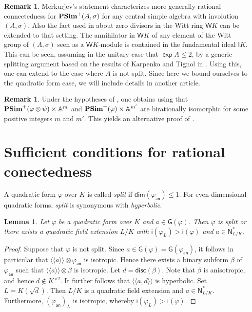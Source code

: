 \documentclass[twoside,11pt]{amsart}
\numberwithin{equation}{section}
\newtheorem{lem}[equation]{Lemma}
\theoremstyle{definition}
\newtheorem{rem}[equation]{Remark}
\renewcommand{\dim}{\operatorname{\mathsf{dim}}}
\renewcommand\exp{\operatorname{\mathsf{exp}}}
\newcommand\N{\operatorname{N}}
\newcommand{\vf}{\varphi}
\newcommand{\sq}[1]{{#1}^{\times 2}}
\newcommand{\s}{\sigma}
\newcommand{\la}{\langle}
\newcommand{\ra}{\rangle}
\newcommand{\lla}{\la\!\la}
\newcommand{\rra}{\ra\!\ra}
\newcommand{\an}{\mathsf{an}}
\renewcommand{\leq}{\leqslant}
\newcommand{\I}{\mathsf{I}}
\renewcommand{\N}{\mathsf{N}}
\newcommand{\disc}{\mathsf{disc}}
\newcommand{\G}{\mathsf{G}}
\renewcommand{\dim}{\mathsf{dim}}
\renewcommand{\leq}{\leqslant}
\newcommand{\wi}{\mathsf{i}}
\begin{document}
\begin{rem}
        Merkurjev's statement \cite[Theorem 1]{Mer96} characterizes more generally rational connectedness for ${\bf PSim}^+(A,\s)$ for any central simple algebra with involution $(A,\s)$.
    Also the fact used in  about zero divisors in the Witt ring $\mathsf{W}K$ can be extended to that setting. The annihilator in $\mathsf{W}K$  of any element of the Witt group of $(A,\s)$ seen as a $\mathsf{W}K$-module is contained in the fundamental ideal $\I K$.  
    This can be seen, assuming in the unitary case that $\exp A\leq 2$, by a generic splitting argument based on the results of Karpenko and Tignol in \cite{Kar10}.
    Using this, one can extend  to the case where $A$ is not split.
    Since here we bound ourselves to the quadratic form case, we will include details in another article.
\end{rem}

\begin{rem}
         Under the hypotheses of , one obtains using \cite[Prop.~4.5]{Mer98} that ${\bf PSim}^+(\vf\otimes \psi)\times \mathbb{A}^m$ and ${\bf PSim}^+(\vf)\times \mathbb{A}^{m'}$ are birationally isomorphic for some positive integers $m$ and $m'$.
     This yields an alternative proof of . 
\end{rem}


\section{Sufficient conditions for rational conectedness}
\label{S:splitting}

A quadratic form $\vf$ over $K$ is called \emph{split} if $\dim(\vf_\an)\leq 1$. For even-dimensional quadratic forms, \emph{split} is synonymous with \emph{hyperbolic}.

\begin{lem}\label{L:beta}
Let $\vf$ be a quadratic form over $K$ and $a\in\G(\vf)$.
Then  $\vf$ is split or there exists a quadratic field extension $L/K$ with $\wi(\vf_L)>\wi(\vf)$ and $a\in\N_{L/K}^\ast$.
\end{lem}
\begin{proof}
Suppose that $\vf$ is not split. Since $a\in\G(\vf)=\G(\vf_\an)$, it follows in particular that $\lla a\rra\otimes\vf_\an$ is isotropic.
Hence there exists a binary subform $\beta$ of $\vf_\an$ such that $\lla a\rra\otimes \beta$ is isotropic.
Let $d=\disc(\beta)$. Note that $\beta$ is anisotropic, and hence $d\notin\sq{K}$. 
It further follows that $\lla a,d\rra$ is hyperbolic.
Set $L=K(\sqrt{d})$. Then $L/K$ is a quadratic field extension and $a\in\N_{L/K}^\ast$. 
Furthermore, $(\vf_\an)_L$ is isotropic, whereby $\wi(\vf_L)>\wi(\vf)$.
\end{proof}
\end{document}
